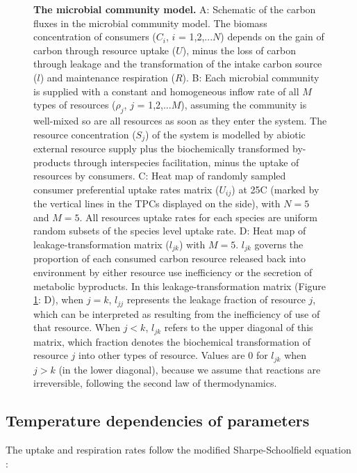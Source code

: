 \documentclass[11pt, a4paper]{article}
\begin{document}
\begin{spacing}{1.5}
\begin{figure}
    \caption{\textbf{The microbial community model.} A: Schematic of the carbon fluxes in the microbial community model. The biomass concentration of consumers ($C_i$, $i$ = 1,2,...$N$) depends on the gain of carbon through resource uptake ($U$), minus the loss of carbon through leakage and the transformation of the intake carbon source ($l$) and maintenance respiration ($R$). B: Each microbial community is supplied with a constant and homogeneous inflow rate of all $M$ types of resources ($\rho_j$, $j$ = 1,2,...$M$), assuming the community is well-mixed so are all resources as soon as they enter the system. The resource concentration ($S_j$) of the system is modelled by abiotic external resource supply plus the biochemically transformed by-products through interspecies facilitation, minus the uptake of resources by consumers. C: Heat map of randomly sampled consumer preferential uptake rates matrix ($U_{ij}$) at 25\textdegree C (marked by the vertical lines in the TPCs displayed on the side), with $N = 5$ and $M = 5$. All resources uptake rates for each species are uniform random subsets of the species level uptake rate. D: Heat map of leakage-transformation matrix ($l_{jk}$) with $M = 5$. $l_{jk}$ governs the proportion of each consumed carbon resource released back into environment by either resource use inefficiency or the secretion of metabolic byproducts. In this leakage-transformation matrix (Figure \ref{fig:schematic}: D), when $j = k$, $l_{jj}$ represents the leakage fraction of resource $j$, which can be interpreted as resulting from the inefficiency of use of that resource. When $j < k$, $l_{jk}$ refers to the upper diagonal of this matrix, which fraction denotes the biochemical transformation of resource $j$ into other types of resource. Values are 0 for $l_{jk}$ when $j > k$ (in the lower diagonal), because we assume that reactions are irreversible, following the second law of thermodynamics. }
    \label{fig:schematic}
\end{figure}

\subsection{Temperature dependencies of parameters}\label{section:TPC}

The uptake and respiration rates follow the modified Sharpe-Schoolfield equation \citep{kontopoulos2020phytoplankton}:


\end{spacing}
\end{document}

